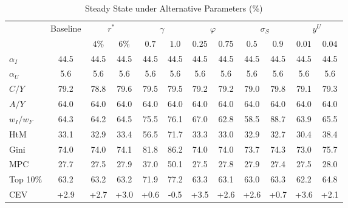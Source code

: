 \begin{table}[htbp]
\centering
\caption{Steady State under Alternative Parameters (\%)}
\label{tab:robustness}
\footnotesize\setlength{\tabcolsep}{4pt}
\begin{tabular}{lccc|cc|cc|cc|cc}
\toprule
 & Baseline & \multicolumn{2}{c}{$r^*$} & \multicolumn{2}{c}{$\gamma$} & \multicolumn{2}{c}{$\varphi$} & \multicolumn{2}{c}{$\sigma_S$} & \multicolumn{2}{c}{$y^U$} \\
\cmidrule(lr){3-4}\cmidrule(lr){5-6}\cmidrule(lr){7-8}\cmidrule(lr){9-10}\cmidrule(lr){11-12}
 & & $4\%$ & $6\%$ & $0.7$ & $1.0$ & $0.25$ & $0.75$ & $0.5$ & $0.9$ & $0.01$ & $0.04$ \\
\midrule
$\alpha_I$ & 44.5 & 44.5 & 44.5 & 44.5 & 44.5 & 44.5 & 44.5 & 44.5 & 44.5 & 44.5 & 44.5 \\
$\alpha_U$ & 5.6 & 5.6 & 5.6 & 5.6 & 5.6 & 5.6 & 5.6 & 5.6 & 5.6 & 5.6 & 5.6 \\
$C/Y$ & 79.2 & 78.8 & 79.6 & 79.5 & 79.5 & 79.2 & 79.2 & 79.0 & 79.8 & 79.1 & 79.3 \\
$A/Y$ & 64.0 & 64.0 & 64.0 & 64.0 & 64.0 & 64.0 & 64.0 & 64.0 & 64.0 & 64.0 & 64.0 \\
$w_I/w_F$ & 64.3 & 64.2 & 64.5 & 75.5 & 76.1 & 67.0 & 62.8 & 58.5 & 88.7 & 63.9 & 65.5 \\
HtM & 33.1 & 32.9 & 33.4 & 56.5 & 71.7 & 33.3 & 33.0 & 32.9 & 32.7 & 30.4 & 38.4 \\
Gini & 74.0 & 74.0 & 74.1 & 81.8 & 86.2 & 74.0 & 74.0 & 73.7 & 74.3 & 73.0 & 75.7 \\
MPC & 27.7 & 27.5 & 27.9 & 37.0 & 50.1 & 27.5 & 27.8 & 27.9 & 27.4 & 27.5 & 28.0 \\
Top 10\% & 63.2 & 63.2 & 63.2 & 71.9 & 77.2 & 63.3 & 63.1 & 63.0 & 63.3 & 62.2 & 64.8 \\
CEV & +2.9 & +2.7 & +3.0 & +0.6 & -0.5 & +3.5 & +2.6 & +2.6 & +0.7 & +3.6 & +2.1 \\
\bottomrule
\end{tabular}
\par{}
\end{table}
